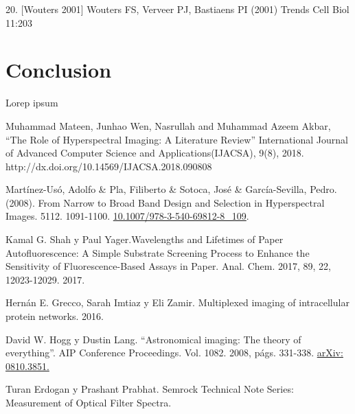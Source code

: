 \documentclass{ctuthesis}
\begin{document}
20. [Wouters 2001] Wouters FS, Verveer PJ, Bastiaens PI (2001) Trends Cell Biol 11:203
\chapter{Conclusion}

Lorep ipsum \cite{doe}


\renewcommand\bibname{Referencias Bibliográficas}
\begin{thebibliography}{1}

 Muhammad Mateen, Junhao Wen, Nasrullah and Muhammad Azeem 
Akbar, “The Role of Hyperspectral Imaging: A Literature Review” International 
Journal of Advanced Computer Science and Applications(IJACSA), 9(8), 2018. 
http://dx.doi.org/10.14569/IJACSA.2018.090808

 Martínez-Usó, Adolfo \& Pla, Filiberto \& Sotoca, José 
\& 
García-Sevilla, Pedro.(2008). From Narrow to Broad Band Design and Selection 
in Hyperspectral Images. 5112. 1091-1100. 
\href{https://www.researchgate.net/publication/221472272_From_Narrow_to_Broad_Band_Design_and_Selection_in_Hyperspectral_Images}{10.1007/978-3-540-69812-8\_109}.
 
 
 
 Kamal G. Shah y Paul Yager.Wavelengths and Lifetimes of 
Paper Autofluorescence: A Simple Substrate Screening Process to Enhance the 
Sensitivity of Fluorescence-Based Assays in Paper. Anal. Chem. 2017,  89, 22, 
12023-12029. 2017.
 
 Hernán E. Grecco, Sarah Imtiaz y Eli Zamir. Multiplexed
imaging of intracellular protein networks. 2016.

 David W. Hogg y Dustin Lang. “Astronomical imaging: The
	theory of everything”. AIP Conference Proceedings. Vol. 1082.
	2008, págs. 331-338. \href{https://arxiv.org/pdf/0810.3851.pdf}{arXiv: 
	0810.3851.}

 Turan Erdogan y Prashant Prabhat. Semrock Technical Note 
Series: Measurement of 
Optical Filter Spectra. 

\end{thebibliography}
\end{document}
